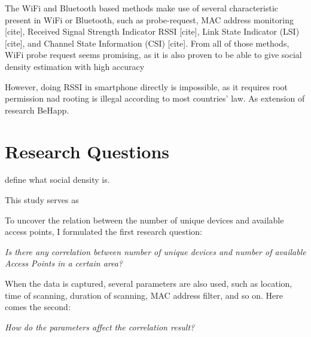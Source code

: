 The WiFi and Bluetooth based methods make use of several characteristic present in WiFi or Bluetooth, such as probe-request, MAC address monitoring [cite], Received Signal Strength Indicator \ac{RSSI} [cite], Link State Indicator (LSI) [cite], and Channel State Information (CSI) [cite]. From all of those methods, WiFi probe request seems promising, as it is also proven to be able to give social density estimation with high accuracy~\cite{}

However, doing \ac{RSSI} in smartphone directly is impossible, as it requires root permission nad rooting is illegal according to most countries' law. As extension of research BeHapp.


\section{Research Questions} %
\label{sec:research_questions}


define what social density is.

This study serves as 

To uncover the relation between the number of unique devices and available access points, I formulated the first research question:
\begin{displayquote}\textit{
Is there any correlation between number of unique devices and number of available Access Points in a certain area?}
\end{displayquote}

When the data is captured, several parameters are also used, such as location, time of scanning, duration of scanning, MAC address filter, and so on. Here comes the second:
\begin{displayquote}\textit{
How do the parameters affect the correlation result?}
\end{displayquote}

